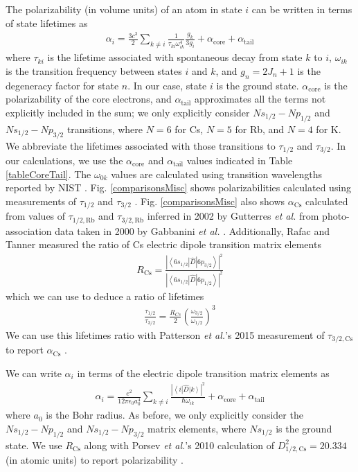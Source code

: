 \documentclass[twocolumn,prl,showpacs,superscriptaddress]{revtex4-1}   %
\newcommand{\brakett}[3]{\left\langle #1 \right|#2\left| #3 \right\rangle}
\newcommand{\figref}[1]{Fig. \ref{#1}}
\newcommand{\acs}{\alpha_{\textrm{Cs}}}
\newcommand{\acore}{\alpha_{\textrm{core}}}
\newcommand{\atail}{\alpha_{\textrm{tail}}}
\newcommand{\rcs}{R_{\mathrm{Cs}}}
\newcommand{\etal}{\textit{et al.}}
\newcommand{\etalspace}{\textit{et al. }}
\begin{document}
The polarizability (in volume units) of an atom in state $i$ can be written in terms of state lifetimes as
\begin{align}
	\alpha_i = \frac{3c^3}{2} \sum_{k\neq i} 
	\frac{1}{\tau_{ki} \omega_{ik}^4} \frac{g_k}{3g_i}
	+ \acore
	+ \atail
	\label{polFromLifetimes}
\end{align}
where $\tau_{ki}$ is the lifetime associated with spontaneous decay from state $k$ to $i$, $\omega_{ik}$ is the transition frequency between states $i$ and $k$, and $g_n = 2J_n+1$ is the degeneracy factor for state $n$. In our case, state $i$ is the ground state. $\acore$ is the polarizability of the core electrons, and $\atail$ approximates all the terms not explicitly included in the sum; we only explicitly consider $Ns_{1/2}-Np_{1/2}$ and $Ns_{1/2}-Np_{3/2}$ transitions, where $N=6$ for Cs, $N=5$ for Rb, and $N=4$ for K. 
We abbreviate the lifetimes associated with those transitions to $\tau_{1/2}$ and $\tau_{3/2}$.
In our calculations, we use the $\acore$ and $\atail$ values indicated in Table \ref{tableCoreTail}.
The $\omega_{0k}$ values are calculated using transition wavelengths reported by NIST \cite{NIST}. 
\figref{comparisonsMisc} shows polarizabilities calculated using measurements of $\tau_{1/2}$ and $\tau_{3/2}$
\cite{Young1994,Rafac1999,Bouloufa2007,Falke2006a,Volz2006,Simsarian1998,Wang1997}.
\figref{comparisonsMisc} also shows $\acs$ calculated from 
values of $\tau_{1/2,\mathrm{Rb}}$ and $\tau_{3/2,\mathrm{Rb}}$ inferred in 2002 by Gutterres \etalspace from photo-association data taken in 2000 by Gabbanini \etalspace \cite{Gabbanini2000,Gutterres2002}.
Additionally, Rafac and Tanner measured the ratio of Cs electric dipole transition matrix elements
\begin{align}
	\rcs = \frac
	{\left|\brakett{6s_{1/2}}{\hat{D}}{6p_{3/2}}\right|^2}
	{\left|\brakett{6s_{1/2}}{\hat{D}}{6p_{1/2}}\right|^2}
	\label{polFromLifetimes}
\end{align}
which we can use to deduce a ratio of lifetimes
\begin{align}
	\frac{\tau_{1/2}}{\tau_{3/2}} = \frac{R_{Cs}}{2} \left( \frac{\omega_{3/2}}{\omega_{1/2}} \right)^3
	\label{RafacRLifetimes}
\end{align}
We can use this lifetimes ratio with Patterson \etal's 2015 measurement of $\tau_{3/2,\mathrm{Cs}}$ to report $\acs$ \cite{Patterson2015}.

We can write $\alpha_i$ in terms of the electric dipole transition matrix elements as
\begin{align}
	\alpha_i = \frac{e^2}{12 \pi \epsilon_0 a_0^4} \sum_{k\neq i}	
	\frac{\left|\brakett{i}{\hat{D}}{k}\right|^2}{\hbar\omega_{ik}}	
	+ \acore
	+ \atail
	\label{polFromMatrixElements}
\end{align}
where $a_0$ is the Bohr radius. 
As before, we only explicitly consider the $Ns_{1/2}-Np_{1/2}$ and $Ns_{1/2}-Np_{3/2}$ matrix elements, 
where $Ns_{1/2}$ is the ground state.
We use $\rcs$ along with Porsev \etal's 2010 calculation of $D_{1/2,\mathrm{Cs}}^2 = 20.334$ (in atomic units) to report polarizability \cite{Rafac1998,Porsev2010}.
\end{document}
